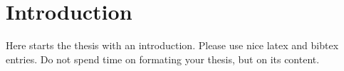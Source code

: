 \chapter{Introduction}
\label{chapter:introduction}


Here starts the thesis with an introduction. Please use nice latex and bibtex entries. Do not spend time on formating your thesis, but on its content. 
